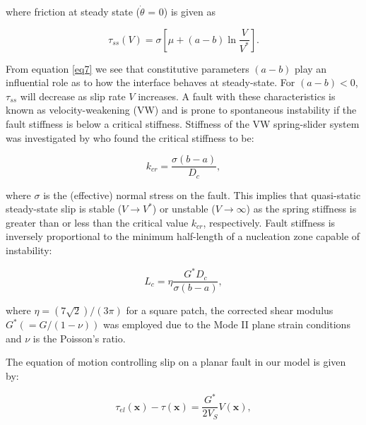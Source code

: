 \documentclass[preprint,1p, 10pt,authoryear]{elsarticle}
\begin{document}
\noindent where friction at steady state ($\dot{\theta} $ = 0) is given as

\begin{equation}
\label{eq7}
\tau_{ss} \left( V \right) = \sigma \left[\mu + \left(a - b \right)\ln\frac{V}{V^{*}}\right].
\end{equation}   

\noindent From equation \eqref{eq7} we see that constitutive parameters $\left(a - b \right)$ play an influential role as to how the interface behaves at steady-state.  For $\left(a - b \right) < 0$, $\tau_{ss}$ will decrease as slip rate $V$ increases.  A fault with these characteristics is known as velocity-weakening (VW) and is prone to spontaneous instability if the fault stiffness is below a critical stiffness. Stiffness of the VW spring-slider system was investigated by \citet{Ranjith1999} who found the critical stiffness to be:

\begin{equation}
\label{eq9}
k_{cr}=\frac{\sigma \left( b-a \right)}{D_{c}},
\end{equation}   

\noindent where $\sigma$ is the (effective) normal stress on the fault. This implies that quasi-static steady-state slip is stable ($V \rightarrow V^{*}$) or unstable ($V \rightarrow \infty$) as the spring stiffness is greater than or less than the critical value $k_{cr}$, respectively. Fault stiffness is inversely proportional to the minimum half-length of a nucleation zone capable of instability:

\begin{equation}
\label{eq8}
L_{c} = \eta \frac{G^{*} D_{c}}{ \sigma \left( b-a\right)},
\end{equation}   

\noindent where $\eta = (7\sqrt{2})/(3\pi)$ \citep{Dieterich1992} for a square patch, the corrected shear modulus $G^{*} (= G/(1-\nu))$ was employed due to the Mode II plane strain conditions and $\nu$ is the Poisson's ratio. 

The equation of motion controlling slip on a planar fault in our model is given by:

\begin{equation}
\label{eq8a}
\tau_{el}\left( \mathbf{x} \right) - \tau\left( \mathbf{x} \right) = \frac{G^{*}}{2 V_{S}} V(\mathbf{x}),
\end{equation}  
\end{document}
